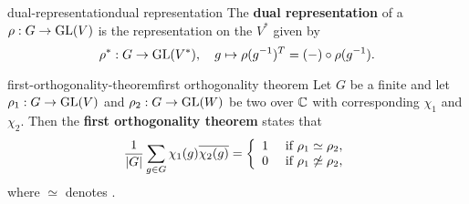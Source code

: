 
\begin{topic}{dual-representation}{dual representation}
    The \textbf{dual representation} of a  $\rho : G \to \textup{GL}(V)$ is the representation on the  $V^*$ given by
    \[ \rho^* : G \to \textup{GL}(V^*), \quad g \mapsto \rho(g^{-1})^T = (-) \circ \rho(g^{-1}) . \]
\end{topic}

\begin{topic}{first-orthogonality-theorem}{first orthogonality theorem}
    Let $G$ be a finite  and let $\rho_1 : G \to \textup{GL}(V)$ and $\rho_2 : G \to \textup{GL}(W)$ be two  over $\mathbb{C}$ with corresponding  $\chi_1$ and $\chi_2$. Then the \textbf{first orthogonality theorem} states that
    \[ \frac{1}{|G|} \sum_{g \in G} \chi_1(g) \overline{\chi_2(g)} = \left\{ \begin{array}{cl} 1 & \textup{ if } \rho_1 \simeq \rho_2 , \\ 0 & \textup{ if } \rho_1 \not\simeq \rho_2 , \end{array} \right. \]
    where $\simeq$ denotes .
\end{topic}

